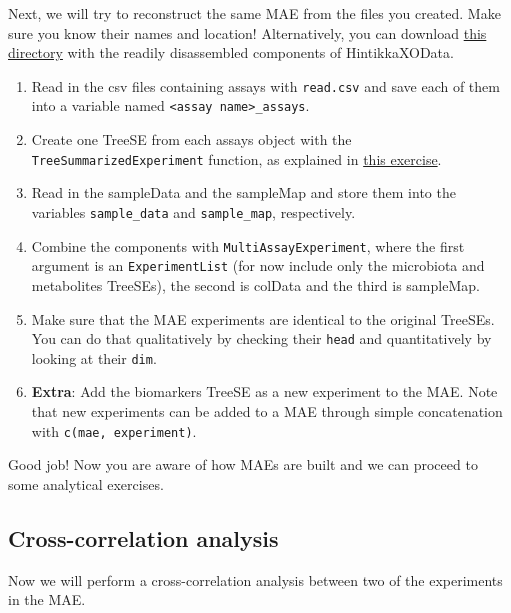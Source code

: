 \documentclass[
]{book}
\providecommand{\tightlist}{%
  \setlength{\itemsep}{0pt}\setlength{\parskip}{0pt}}
\begin{document}
Next, we will try to reconstruct the same MAE from the files you created.
Make sure you know their names and location! Alternatively, you can download
\href{https://github.com/microbiome/course_2023_oulu/tree/main/data}{this directory}
with the readily disassembled components of HintikkaXOData.

\begin{enumerate}
\def\labelenumi{\arabic{enumi}.}
\tightlist
\item
  Read in the csv files containing assays with \texttt{read.csv} and save each
  of them into a variable named \texttt{\textless{}assay\ name\textgreater{}\_assays}.
\item
  Create one TreeSE from each assays object with the \texttt{TreeSummarizedExperiment}
  function, as explained in \protect\hyperlink{construct-TreeSE}{this exercise}.
\item
  Read in the sampleData and the sampleMap and store them into the
  variables \texttt{sample\_data} and \texttt{sample\_map}, respectively.
\item
  Combine the components with \texttt{MultiAssayExperiment}, where the first argument
  is an \texttt{ExperimentList} (for now include only the microbiota and metabolites
  TreeSEs), the second is colData and the third is sampleMap.
\item
  Make sure that the MAE experiments are identical to the original TreeSEs. You
  can do that qualitatively by checking their \texttt{head} and quantitatively by
  looking at their \texttt{dim}.
\item
  \textbf{Extra}: Add the biomarkers TreeSE as a new experiment to the MAE.
  Note that new experiments can be added to a MAE through simple concatenation
  with \texttt{c(mae,\ experiment)}.
\end{enumerate}

Good job! Now you are aware of how MAEs are built and we can proceed to some
analytical exercises.

\hypertarget{cross-correlation-analysis}{%
\subsection{Cross-correlation analysis}\label{cross-correlation-analysis}}

Now we will perform a cross-correlation analysis between two of the
experiments in the MAE.
\end{document}
